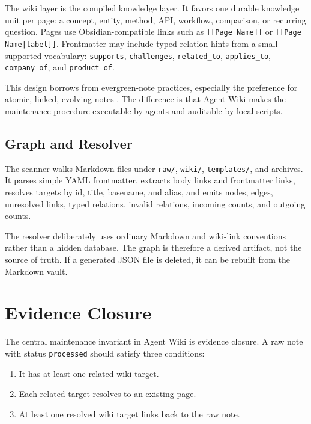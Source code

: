 \documentclass[10pt]{article}
\begin{document}
The wiki layer is the compiled knowledge layer. It favors one durable knowledge
unit per page: a concept, entity, method, API, workflow, comparison, or recurring
question. Pages use Obsidian-compatible links such as \texttt{[[Page Name]]} or
\texttt{[[Page Name|label]]}. Frontmatter may include typed relation hints from
a small supported vocabulary: \texttt{supports}, \texttt{challenges},
\texttt{related\_to}, \texttt{applies\_to}, \texttt{company\_of}, and
\texttt{product\_of}.

This design borrows from evergreen-note practices, especially the preference for
atomic, linked, evolving notes \cite{matuschakEvergreen}. The difference is that
Agent Wiki makes the maintenance procedure executable by agents and auditable by
local scripts.

\subsection{Graph and Resolver}

The scanner walks Markdown files under \texttt{raw/}, \texttt{wiki/},
\texttt{templates/}, and archives. It parses simple YAML frontmatter, extracts
body links and frontmatter links, resolves targets by id, title, basename, and
alias, and emits nodes, edges, unresolved links, typed relations, invalid
relations, incoming counts, and outgoing counts.

The resolver deliberately uses ordinary Markdown and wiki-link conventions
rather than a hidden database. The graph is therefore a derived artifact, not the
source of truth. If a generated JSON file is deleted, it can be rebuilt from the
Markdown vault.

\section{Evidence Closure}

The central maintenance invariant in Agent Wiki is evidence closure. A raw note
with status \texttt{processed} should satisfy three conditions:

\begin{enumerate}[leftmargin=1.5em]
  \item It has at least one related wiki target.
  \item Each related target resolves to an existing page.
  \item At least one resolved wiki target links back to the raw note.
\end{enumerate}
\end{document}
